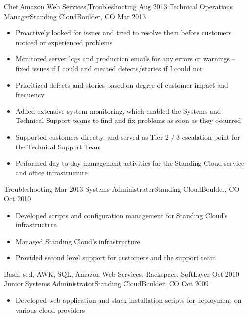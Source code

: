 \begin{experiences}
{\begin{itemize}
                      \end{itemize}
                    }
                    {Chef,Amazon Web Services,Troubleshooting}
  \emptySeparator
  \experience
    {Aug 2013}      {Technical Operations Manager}{Standing Cloud}{Boulder, CO}
    {Mar 2013}      {
                      \begin{itemize}
                        \item Proactively looked for issues and tried to resolve them before customers noticed or experienced problems
                        \item Monitored server logs and production emails for any errors or warnings -- fixed issues if I could and created defects/stories if I could not
                        \item Prioritized defects and stories based on degree of customer impact and frequency
                        \item Added extensive system monitoring, which enabled the Systems and Technical Support teams to find and fix problems as soon as they occurred
                        \item Supported customers directly, and served as Tier 2 / 3 escalation point for the Technical Support Team
                        \item Performed day-to-day management activities for the Standing Cloud service and office infrastructure
                      \end{itemize}
                    }
                    {Troubleshooting}
  \emptySeparator
  \experience
    {Mar 2013}      {Systems Administrator}{Standing Cloud}{Boulder, CO}
    {Oct 2010}      {
                      \begin{itemize}
                        \item Developed scripts and configuration management for Standing Cloud's infrastructure
                        \item Managed Standing Cloud's infrastructure
                        \item Provided second level support for customers and the support team
                      \end{itemize}
                    }
                    {Bash, sed, AWK, SQL, Amazon Web Services, Rackspace, SoftLayer}
  \emptySeparator
  \experience
    {Oct 2010}      {Junior Systems Administrator}{Standing Cloud}{Boulder, CO}
    {Oct 2009}      {
                      \begin{itemize}
                        \item Developed web application and stack installation scripts for deployment on various cloud providers

\end{itemize}}
\end{experiences}
